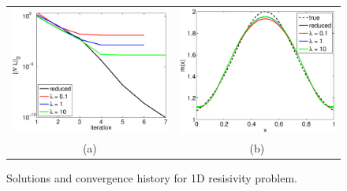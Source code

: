 \documentclass{iopart}
\begin{document}
\begin{figure}
\centering
\begin{tabular}{cc}
\includegraphics[scale=.4]{./figs/1D_exp1_a}&
\includegraphics[scale=.4]{./figs/1D_exp1_b}\\
{\small (a)}&{\small (b)}\\
\end{tabular}
\caption{Solutions and convergence history for 1D resisivity problem.}
\label{fig:1D_exp1}
\end{figure}
\end{document}
